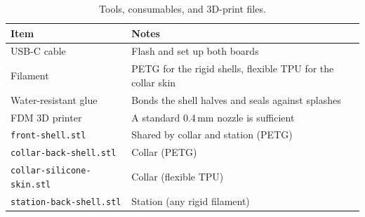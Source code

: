 \begin{table}[ht]
  \centering
  \caption{Tools, consumables, and 3D-print files.}
  \label{tab:bom-tools}
  \begin{tabularx}{\textwidth}{@{}lX@{}}
    \toprule
    \textbf{Item} & \textbf{Notes} \\
    \midrule
    USB-C cable                 & Flash and set up both boards \\
    Filament                    & PETG for the rigid shells, flexible TPU for the collar skin \\
    Water-resistant glue        & Bonds the shell halves and seals against splashes \\
    FDM 3D printer              & A standard 0.4\,mm nozzle is sufficient \\
    \texttt{front-shell.stl}    & Shared by collar and station (PETG) \\
    \texttt{collar-back-shell.stl} & Collar (PETG) \\
    \texttt{collar-silicone-skin.stl} & Collar (flexible TPU) \\
    \texttt{station-back-shell.stl} & Station (any rigid filament) \\
    \bottomrule
  \end{tabularx}
\end{table}
